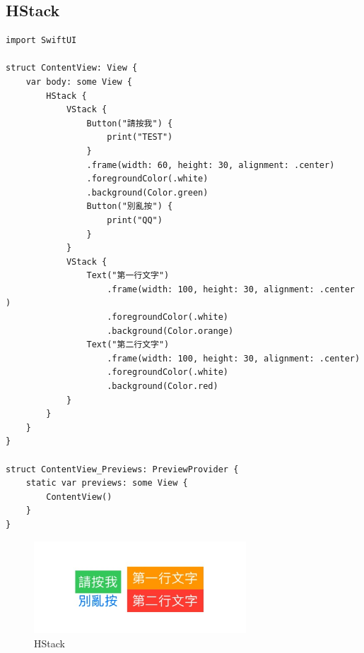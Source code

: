 \documentclass[a4paper,12pt]{article}
\begin{document}
\subsection{HStack}
\label{sec:orge0454bd}
\lstset{breaklines=true,language=swift,label= ,caption= ,captionpos=b,firstnumber=1,numbers=left}
\begin{lstlisting}
import SwiftUI

struct ContentView: View {
    var body: some View {
        HStack {
            VStack {
                Button("請按我") {
                    print("TEST")
                }
                .frame(width: 60, height: 30, alignment: .center)
                .foregroundColor(.white)
                .background(Color.green)
                Button("別亂按") {
                    print("QQ")
                }
            }
            VStack {
                Text("第一行文字")
                    .frame(width: 100, height: 30, alignment: .center   )
                    .foregroundColor(.white)
                    .background(Color.orange)
                Text("第二行文字")
                    .frame(width: 100, height: 30, alignment: .center)
                    .foregroundColor(.white)
                    .background(Color.red)
            }
        }
    }
}

struct ContentView_Previews: PreviewProvider {
    static var previews: some View {
        ContentView()
    }
}
\end{lstlisting}

\begin{figure}[htbp]
\centering
\includegraphics[width=300]{images/hstack-1.jpg}
\caption{\label{fig:HStack-1}HStack}
\end{figure}
\end{document}
